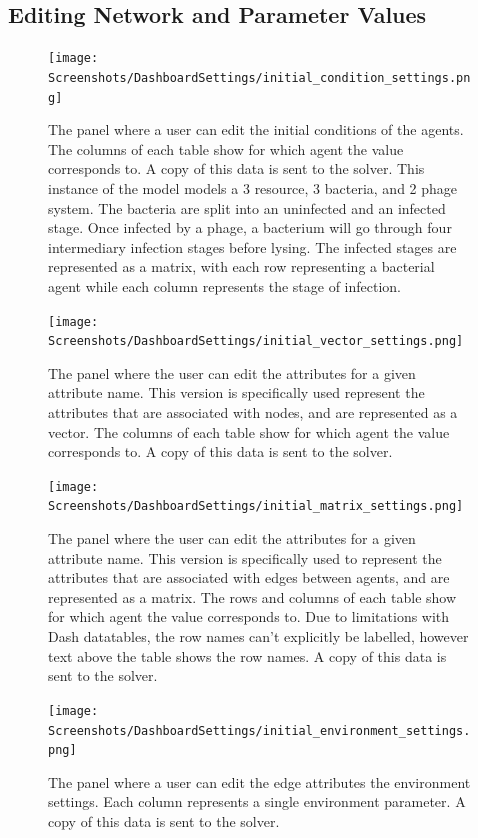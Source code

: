 \subsection{Editing Network and Parameter Values}
\label{sec:editing_network_and_parameter_values}
\begin{figure}
    \centering
    \texttt{[image: Screenshots/DashboardSettings/initial\_condition\_settings.png]}
    \caption{
        The panel where a user can edit the initial conditions of the agents. 
        The columns of each table show for which agent the value corresponds to. 
        A copy of this data is sent to the solver. 
        This instance of the model models a 3 resource, 3 bacteria, and 2 phage system. 
        The bacteria are split into an uninfected and an infected stage. 
        Once infected by a phage, a bacterium will go through four intermediary infection stages before lysing. 
        The infected stages are represented as a matrix, with each row representing a bacterial agent while each column represents the stage of infection. 
    }
    \label{fig:ss:ds:initial_condition}
\end{figure}
\begin{figure}
    \centering
    \texttt{[image: Screenshots/DashboardSettings/initial\_vector\_settings.png]}
    \caption{
        The panel where the user can edit the attributes for a given attribute name. 
        This version is specifically used represent the attributes that are associated with nodes, and are represented as a vector. 
        The columns of each table show for which agent the value corresponds to. 
        A copy of this data is sent to the solver.
    }
    \label{fig:ss:ds:vector}
\end{figure}
\begin{figure}
    \centering
    \texttt{[image: Screenshots/DashboardSettings/initial\_matrix\_settings.png]}
    \caption{
        The panel where the user can edit the attributes for a given attribute name. 
        This version is specifically used to represent the attributes that are associated with edges between agents, and are represented as a matrix. 
        The rows and columns of each table show for which agent the value corresponds to. 
        Due to limitations with Dash datatables, the row names can't explicitly be labelled, however text above the table shows the row names. 
        A copy of this data is sent to the solver. 
    }
    \label{fig:ss:ds:matrix}
\end{figure}
\begin{figure}
    \centering
    \texttt{[image: Screenshots/DashboardSettings/initial\_environment\_settings.png]}
    \caption{
        The panel where a user can edit the edge attributes the environment settings. 
        Each column represents a single environment parameter. 
        A copy of this data is sent to the solver.
    }
    \label{fig:ss:ds:environment}
\end{figure}
